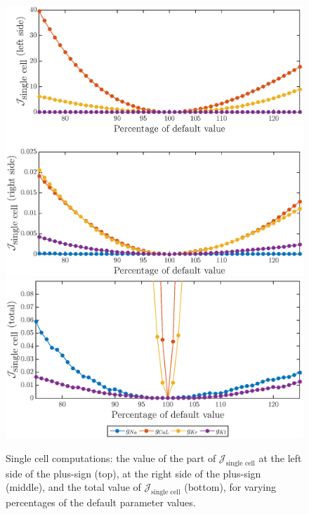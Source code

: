 \documentclass[12pt,a4paper]{article}
\begin{document}
\begin{figure}
\includegraphics[trim=0cm 0cm 0cm 1cm, clip=true, width=1\linewidth]{sc_functional_values} 
\includegraphics[trim=0cm 1cm 0cm 1cm, clip=true, width=1\linewidth]{sc_functional_values2} 
    \caption{Single cell computations: the value of the part of $\mathcal{J}_{\text{single cell}}$ at the left side of the plus-sign (top), at the right side of the plus-sign (middle), and the total value of $\mathcal{J}_{\text{single cell}}$ (bottom), for varying percentages of the default parameter values.}
    \label{fig:8}
\end{figure} 
%
\end{document}
